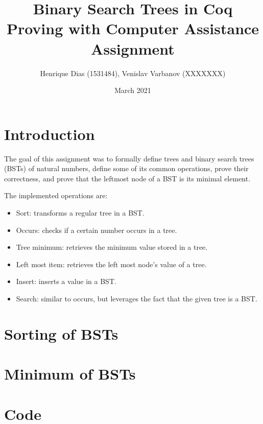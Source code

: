 \documentclass[a4paper]{article}
\title{%
  Binary Search Trees in Coq \\
  \large Proving with Computer Assistance Assignment}
\author{Henrique Dias (1531484), Venislav Varbanov (XXXXXXX)}
\date{March 2021}
\begin{document}
\maketitle



\section{Introduction}

The goal of this assignment was to formally define trees and binary search trees (BSTs) of natural numbers, define some of its common operations, prove their correctness, and prove that the leftmost node of a BST is its minimal element.

The implemented operations are:

\begin{itemize}[noitemsep]
    \item Sort: transforms a regular tree in a BST.
    \item Occurs: checks if a certain number occurs in a tree.
    \item Tree minimum: retrieves the minimum value stored in a tree.
    \item Left most item: retrieves the left most node's value of a tree.
    \item Insert: inserts a value in a BST.
    \item Search: similar to occurs, but leverages the fact that the given tree is a BST.
\end{itemize}

\section{Sorting of BSTs}

\section{Minimum of BSTs}

\appendix

\section{Code}


\end{document}
